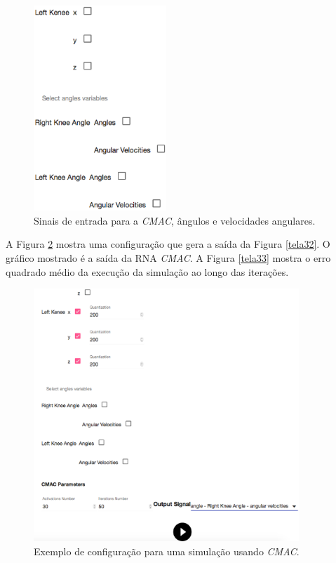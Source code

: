 \begin{figure}[H]
	\centering
	\includegraphics[width=5cm]{figuras/tela30.eps}
	\caption{Sinais de entrada para a \emph{CMAC}, ângulos e velocidades angulares.}
\label{tela30}
\end{figure}


A Figura \ref{tela31} mostra uma configuração que gera a saída da Figura \ref{tela32}.  O gráfico mostrado é a saída da RNA  \emph{CMAC}. 
A Figura \ref{tela33} mostra o erro quadrado médio da execução da simulação ao longo das iterações.
\begin{figure}[H]
	\centering
	\includegraphics[width=10cm]{figuras/tela31.eps}
	\caption{Exemplo de configuração para uma simulação usando \emph{CMAC}.}
\label{tela31}
\end{figure}

